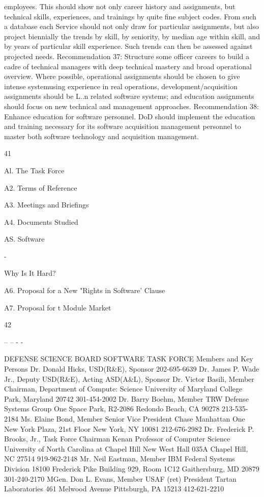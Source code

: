 \documentclass[12pt]{article}
\begin{document}
employees. This should show not only career history and assignments, but technical skills,
experiences, and trainings by quite fine subject codes.
From such a database each Service should not only draw for particular assignments,
but also project biennially the trends by skill, by seniority, by median age within skill, and
by years of particular skill experience. Such trends can then be assessed against projected
needs.
Recommendation 37: Structure some officer careers to build a cadre
of technical managers with deep technical mastery and broad operational
overview.
Where possible, operational assignments should be chosen to give intense systemusing experience in real operations, development/acquisition assignments should be L..n
related software systems; and education assignments should focus on new technical and
management approaches.
Recommendation 38: Enhance education for software personnel.
DoD should implement the education and training necessary for its software acquisition
management personnel to master both software technology and acquisition management.

41


Al. The Task Force

A2. Terms of Reference

A3. Meetings and Briefings

A4. Documents Studied

AS. Software

-

Why Is It Hard?

A6. Proposal for a New "Rights in Software' Clause

A7. Proposal for t Module Market

42

-- -- - -

DEFENSE SCIENCE BOARD SOFTWARE TASK FORCE
Members and Key Persons
Dr. Donald Hicks, USD(R\&E), Sponsor 202-695-6639
Dr. James P. Wade Jr., Deputy USD(R\&E), Acting ASD(A\&L), Sponsor
Dr. Victor Basili, Member
Chairman, Department of Compute: Science
University of Maryland
College Park, Maryland 20742
301-454-2002
Dr. Barry Boehm, Member
TRW Defense Systems Group
One Space Park, R2-2086
Redondo Beach, CA 90278
213-535-2184
Ms. Elaine Bond, Member
Senior Vice President
Chase Manhattan
One New York Plaza, 21st Floor
New York, NY 10081
212-676-2982
Dr. Frederick P. Brooks, Jr., Task Force Chairman
Kenan Professor of Computer Science
University of North Carolina at Chapel Hill
New West Hall 035A
Chapel Hill, NC 27514
919-962-2148
Mr. Neil Eastman, Member
IBM Federal Systems Division
18100 Frederick Pike
Building 929, Room 1C12
Gaithersburg, MD 20879
301-240-2170
MGen. Don L. Evans, Member
USAF (ret)
President
Tartan Laboratories
461 Melwood Avenue
Pittsburgh, PA 15213
412-621-2210
\end{document}
